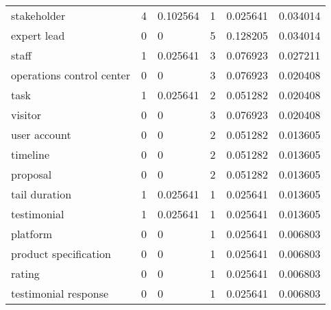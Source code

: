 \begin{landscape}
\begin{longtable}{@{}llllll@{}}
stakeholder                & 4          & 0.102564            & 1           & 0.025641             & 0.034014                              \\
expert lead                & 0          & 0                   & 5           & 0.128205             & 0.034014                              \\
staff                      & 1          & 0.025641            & 3           & 0.076923             & 0.027211                              \\
operations control center  & 0          & 0                   & 3           & 0.076923             & 0.020408                              \\
task                       & 1          & 0.025641            & 2           & 0.051282             & 0.020408                              \\
visitor                    & 0          & 0                   & 3           & 0.076923             & 0.020408                              \\
user account               & 0          & 0                   & 2           & 0.051282             & 0.013605                              \\
timeline                   & 0          & 0                   & 2           & 0.051282             & 0.013605                              \\
proposal                   & 0          & 0                   & 2           & 0.051282             & 0.013605                              \\
tail duration              & 1          & 0.025641            & 1           & 0.025641             & 0.013605                              \\
testimonial                & 1          & 0.025641            & 1           & 0.025641             & 0.013605                              \\
platform                   & 0          & 0                   & 1           & 0.025641             & 0.006803                              \\
product specification      & 0          & 0                   & 1           & 0.025641             & 0.006803                              \\
rating                     & 0          & 0                   & 1           & 0.025641             & 0.006803                              \\
testimonial response       & 0          & 0                   & 1           & 0.025641             & 0.006803                              \\* \bottomrule
\end{longtable}
\end{landscape}



